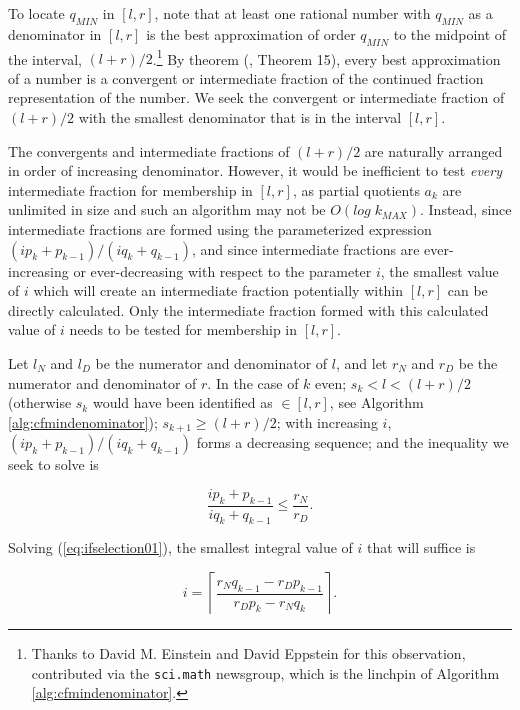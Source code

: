 \documentclass{esub2acm}
\begin{document}
To locate $q_{MIN}$ in $[l,r]$, note that at least one rational number
with $q_{MIN}$ as a denominator in $[l,r]$ is the best approximation
of order $q_{MIN}$ to the midpoint of the interval,
$(l+r)/2$.\footnote{Thanks to David M. Einstein and David Eppstein
for this observation, contributed via the \texttt{sci.math} newsgroup,
which is the linchpin of Algorithm \ref{alg:cfmindenominator}.}
By theorem (\cite{KhinchinClassic}, Theorem 15), every best approximation
of a number is a convergent or intermediate fraction of the
continued fraction representation of the number.  We seek the
convergent or intermediate fraction of $(l+r)/2$ with the smallest
denominator that is in the interval $[l,r]$.

The convergents and intermediate fractions of $(l+r)/2$ are naturally
arranged in order of increasing denominator.  However, it would be
inefficient to test \emph{every} intermediate fraction
for membership in $[l,r]$, as partial quotients $a_k$ are unlimited in
size and such an algorithm may not be $O(log \; k_{MAX})$.  Instead,
since intermediate fractions are formed using the parameterized
expression $(i p_k + p_{k-1})/(i q_k + q_{k-1})$,
and since intermediate fractions are ever-increasing
or ever-decreasing with respect to the parameter $i$, the
smallest value of $i$ which will create an intermediate
fraction potentially within $[l,r]$ can be directly
calculated.  Only the intermediate fraction formed with
this calculated value of $i$ needs to be tested for membership in
$[l,r]$.

Let $l_N$ and $l_D$ be the numerator and denominator of $l$, and
let $r_N$ and $r_D$ be the numerator and denominator of $r$.
In the case of $k$ even; $s_k < l < (l+r)/2$ (otherwise $s_k$
would have been identified as $\in [l,r]$, see Algorithm
\ref{alg:cfmindenominator}); $s_{k+1} \geq (l+r)/2$;
with increasing $i$, $(i p_k + p_{k-1})/(i q_k + q_{k-1})$
forms a decreasing sequence; and the inequality we seek to solve is

\begin{equation}
\label{eq:ifselection01}
\frac{i p_k + p_{k-1}}{i q_k + q_{k-1}} \leq \frac{r_N}{r_D}.
\end{equation}

Solving (\ref{eq:ifselection01}), the smallest integral value of $i$ that will suffice is

\begin{equation}
\label{eq:ifselection02}
i = \left\lceil {
\frac{r_N q_{k-1} - r_D p_{k-1}}{r_D p_k - r_N q_k}
} \right\rceil .
\end{equation}
\end{document}
